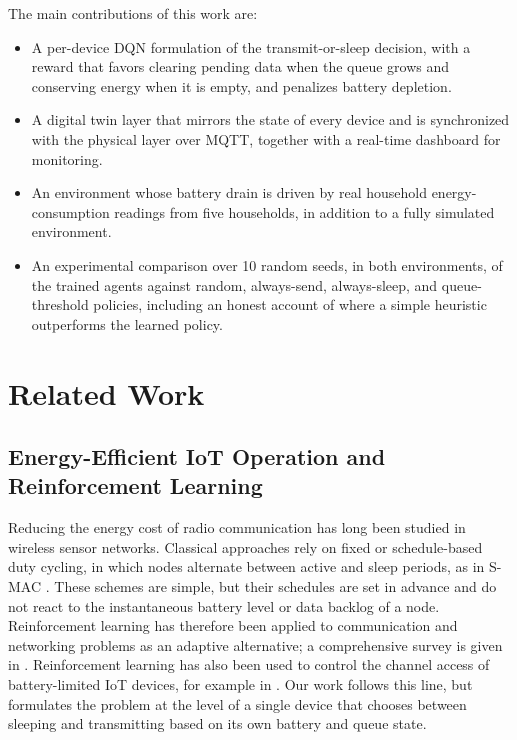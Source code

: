 \documentclass[conference]{IEEEtran}
\begin{document}
The main contributions of this work are:
\begin{itemize}
    \item A per-device DQN formulation of the transmit-or-sleep decision, with a reward that favors clearing pending data when the queue grows and conserving energy when it is empty, and penalizes battery depletion.
    \item A digital twin layer that mirrors the state of every device and is synchronized with the physical layer over MQTT, together with a real-time dashboard for monitoring.
    \item An environment whose battery drain is driven by real household energy-consumption readings from five households, in addition to a fully simulated environment.
    \item An experimental comparison over 10 random seeds, in both environments, of the trained agents against random, always-send, always-sleep, and queue-threshold policies, including an honest account of where a simple heuristic outperforms the learned policy.
\end{itemize}

\section{Related Work}
\label{sec:related}

\subsection{Energy-Efficient IoT Operation and Reinforcement Learning}
Reducing the energy cost of radio communication has long been studied in wireless sensor networks. Classical approaches rely on fixed or schedule-based duty cycling, in which nodes alternate between active and sleep periods, as in S-MAC \cite{ye2002smac}. These schemes are simple, but their schedules are set in advance and do not react to the instantaneous battery level or data backlog of a node. Reinforcement learning has therefore been applied to communication and networking problems as an adaptive alternative; a comprehensive survey is given in \cite{luong2019}. Reinforcement learning has also been used to control the channel access of battery-limited IoT devices, for example in \cite{chu2019}. Our work follows this line, but formulates the problem at the level of a single device that chooses between sleeping and transmitting based on its own battery and queue state.
\end{document}
